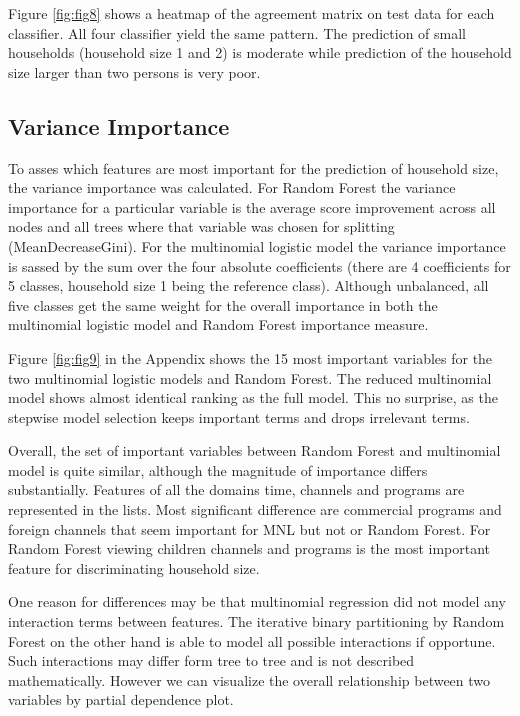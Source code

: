 \documentclass[]{article}
\begin{document}
Figure \ref{fig:fig8} shows a heatmap of the agreement matrix on test
data for each classifier. All four classifier yield the same pattern.
The prediction of small households (household size 1 and 2) is moderate
while prediction of the household size larger than two persons is very
poor.

\hypertarget{variance-importance}{%
\subsection{Variance Importance}\label{variance-importance}}

To asses which features are most important for the prediction of
household size, the variance importance was calculated. For Random
Forest the variance importance for a particular variable is the average
score improvement across all nodes and all trees where that variable was
chosen for splitting (MeanDecreaseGini). For the multinomial logistic
model the variance importance is sassed by the sum over the four
absolute coefficients (there are 4 coefficients for 5 classes, household
size 1 being the reference class). Although unbalanced, all five classes
get the same weight for the overall importance in both the multinomial
logistic model and Random Forest importance measure.

Figure \ref{fig:fig9} in the Appendix shows the 15 most important
variables for the two multinomial logistic models and Random Forest. The
reduced multinomial model shows almost identical ranking as the full
model. This no surprise, as the stepwise model selection keeps important
terms and drops irrelevant terms.

Overall, the set of important variables between Random Forest and
multinomial model is quite similar, although the magnitude of importance
differs substantially. Features of all the domains time, channels and
programs are represented in the lists. Most significant difference are
commercial programs and foreign channels that seem important for MNL but
not or Random Forest. For Random Forest viewing children channels and
programs is the most important feature for discriminating household
size.

One reason for differences may be that multinomial regression did not
model any interaction terms between features. The iterative binary
partitioning by Random Forest on the other hand is able to model all
possible interactions if opportune. Such interactions may differ form
tree to tree and is not described mathematically. However we can
visualize the overall relationship between two variables by partial
dependence plot.
\end{document}
